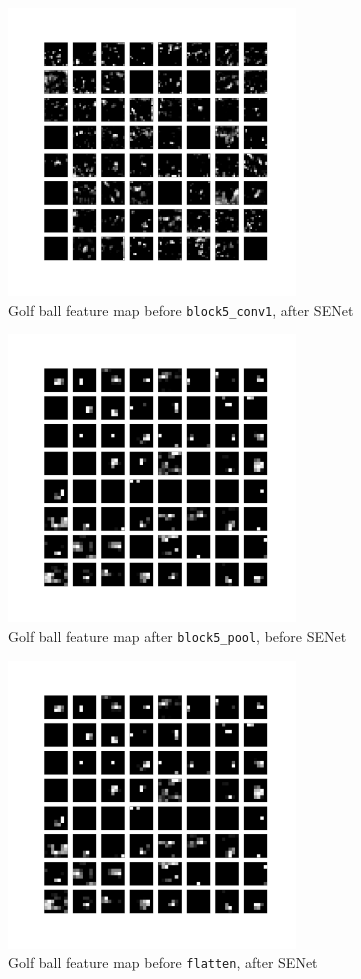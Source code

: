 \documentclass{article}
\begin{document}
\begin{appendices}
\begin{figure}[H]
    \centering
    \includegraphics[width=3in]{csci-8110/hw-3/images/golf-post-SENet-block4_pool-2020-11-05 18_35_33.867099_output.png}
    \caption{Golf ball feature map before \lstinline{block5_conv1}, after SENet}
    \label{fig:golf_4_post}
\end{figure}
\begin{figure}[H]
    \centering
    \includegraphics[width=3in]{csci-8110/hw-3/images/golf-pre-SENet-block5_pool-2020-11-05 18_44_09.014537_output.png}
    \caption{Golf ball feature map after \lstinline{block5_pool}, before SENet}
    \label{fig:golf_5_pre}
\end{figure}

\begin{figure}[H]
    \centering
    \includegraphics[width=3in]{csci-8110/hw-3/images/golf-post-SENet-block5_pool-2020-11-05 18_44_11.709641_output.png}
    \caption{Golf ball feature map before \lstinline{flatten}, after SENet}
    \label{fig:golf_5_post}
\end{figure}


\end{appendices}
\end{document}
